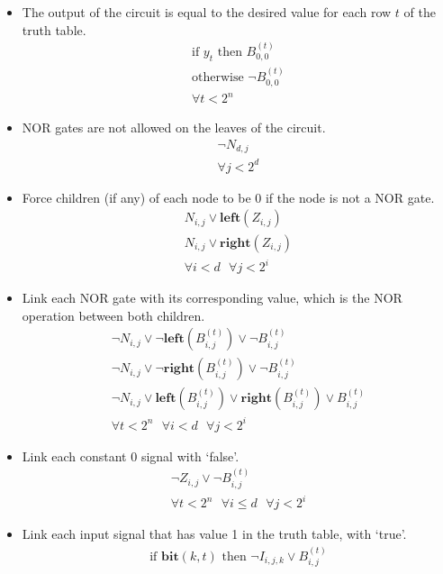\documentclass[letterpaper,10pt]{article}
\begin{document}
\begin{itemize}
    \item The output of the circuit is equal to the desired value for each row $t$ of the truth table.
    \begin{align*}
        \text{if }y_t\text{ then }B_{0,0}^{(t)} \\
        \text{otherwise }\lnot B_{0,0}^{(t)} \\
        \forall t < 2^n
    \end{align*}
    \item NOR gates are not allowed on the leaves of the circuit.
    \begin{align*}
        \lnot N_{d,j} \\
        \forall j < 2^d 
    \end{align*}
    \item Force children (if any) of each node to be 0 if the node is not a NOR gate.
    \begin{align*}
        N_{i,j} \lor \mathbf{left}(Z_{i,j}) \\
        N_{i,j} \lor \mathbf{right}(Z_{i,j}) \\
        \forall i < d\text{ }\forall j < 2^i
    \end{align*}
    \item Link each NOR gate with its corresponding value, which is the NOR operation between both children.
    \begin{align*}
        \lnot N_{i,j} \lor \lnot \mathbf{left}(B_{i,j}^{(t)}) \lor \lnot B_{i,j}^{(t)} \\
        \lnot N_{i,j} \lor \lnot \mathbf{right}(B_{i,j}^{(t)}) \lor \lnot B_{i,j}^{(t)} \\
        \lnot N_{i,j} \lor \mathbf{left}(B_{i,j}^{(t)}) \lor \mathbf{right}(B_{i,j}^{(t)}) \lor B_{i,j}^{(t)} \\
        \forall t < 2^n\text{ }\forall i < d\text{ }\forall j < 2^i
    \end{align*}
    \item Link each constant 0 signal with `false'.
    \begin{align*}
        \lnot Z_{i,j}  \lor \lnot B_{i,j}^{(t)} \\
        \forall t < 2^n\text{ }\forall i \leq d\text{ }\forall j < 2^i
    \end{align*}
    \item Link each input signal that has value 1 in the truth table, with `true'.
    \begin{align*}
        \text{if }\mathbf{bit}(k,t)\text{ then }\lnot I_{i,j,k} \lor B_{i,j}^{(t)} \\

\end{align*}
\end{itemize}
\end{document}
